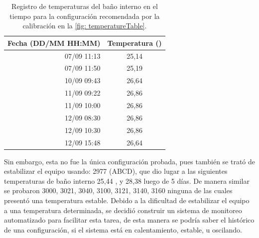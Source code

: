 	\begin{table}[h]
		\centering
		\caption{Registro de temperaturas del baño interno en el tiempo para la configuración recomendada por la calibración en la \autoref{fig: temperatureTable}.}
		\begin{tabular}{r|c}
			\hline
			\textbf{Fecha (DD/MM HH:MM)} & \textbf{Temperatura (\grad{})} \\
			\hline
			07/09 11:13 & 25,14 \\
			07/09 11:50 & 25,19 \\
			10/09 09:43 & 26,64 \\
			11/09 09:22 & 26,86 \\
			11/09 10:00 & 26,86 \\
			12/09 08:30 & 26,86 \\
			12/09 10:30 & 26,86 \\
			12/09 15:48 & 26,64 \\
			\hline
		\end{tabular}
		\label{tb: temperatureRegister}
	\end{table}
	
	Sin embargo, esta no fue la única configuración probada, pues también se trató de estabilizar el equipo usando: 2977 (ABCD), que dio lugar a las siguientes temperaturas de baño interno 25,44 \grad{}, y 28,38 \grad{} luego de 5 días. De manera similar se probaron 3000, 3021, 3040, 3100, 3121, 3140, 3160 ninguna de las cuales presentó una temperatura estable. Debido a la dificultad de estabilizar el equipo a una temperatura determinada, se decidió construir un sistema de monitoreo automatizado para facilitar esta tarea, de esta manera se podría saber el histórico de una configuración, si el sistema está en calentamiento, estable, u oscilando.
	
